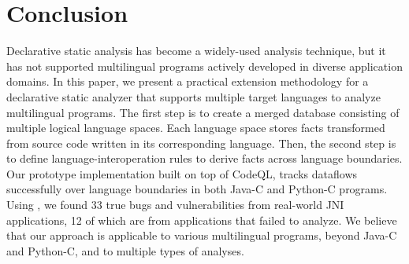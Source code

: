 \section{Conclusion}\label{sec:conclude}
Declarative static analysis has become a widely-used analysis technique, but it
has not supported multilingual programs actively developed in diverse
application domains.
In this paper, we present a practical extension methodology for a declarative static
analyzer that supports multiple target languages to analyze multilingual programs.
The first step is to create a merged database consisting of multiple logical language
spaces. Each language space stores facts transformed from source code written in its
corresponding language.
Then, the second step is to define language-interoperation rules to derive facts
across language boundaries.
Our prototype implementation \ours built on top of CodeQL, tracks dataflows
successfully over language boundaries in both Java-C and Python-C programs.
Using \ours, we found 33 true bugs and vulnerabilities from real-world
JNI applications, 12 of which are from applications that \lees failed to analyze.
We believe that our approach is applicable to various multilingual programs,
beyond Java-C and Python-C, and to multiple types of analyses.

